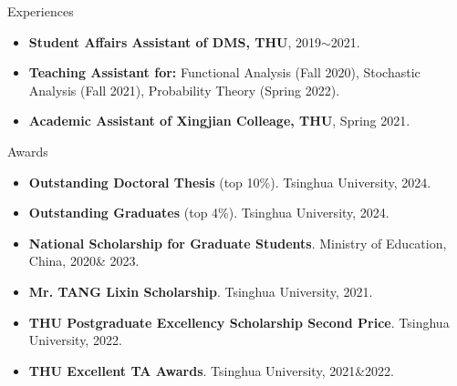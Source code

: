 \documentclass[
	11pt, %
]{resume} %
\begin{document}
\begin{rSection}{Experiences}
\begin{itemize}
    \item {\bf Student Affairs Assistant of DMS, THU}, 2019$\sim$2021.
    \item {\bf Teaching Assistant for:} Functional Analysis (Fall 2020), Stochastic Analysis (Fall 2021), Probability Theory (Spring 2022).
    \item {\bf Academic Assistant of Xingjian Colleage, THU}, Spring 2021.
\end{itemize}
   
\end{rSection}


\begin{rSection}{Awards}

	\begin{itemize}
        \item {\bf Outstanding Doctoral Thesis} (top 10\%). Tsinghua University, 2024.
        \item {\bf Outstanding Graduates} (top 4\%). Tsinghua University, 2024.
		\item {\bf National Scholarship for Graduate Students}. Ministry of Education, China, 2020\& 2023. 
		\item {\bf Mr. TANG Lixin Scholarship}. Tsinghua University, 2021.
		\item {\bf THU Postgraduate Excellency Scholarship Second Price}. Tsinghua University, 2022.
		\item {\bf THU Excellent TA Awards}. Tsinghua University, 2021\&2022.
	\end{itemize}

\end{rSection}





\end{document}
